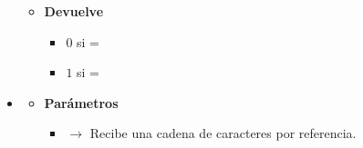 \begin{itemize}
\begin{itemize}
\begin{itemize}
		\end{itemize}
		\item \textbf{Devuelve}
		\begin{itemize}
			\item $0$ si  = 
			\item $1$ si  = 
		\end{itemize}
	\end{itemize}
	\item\label{def:estviaje}
	\begin{itemize}
		\item \textbf{Parámetros}
		\begin{itemize}
			\item {} $\rightarrow$ Recibe una cadena de caracteres por referencia.
			

\end{itemize}
\end{itemize}
\end{itemize}
